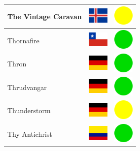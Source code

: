 \documentclass[12pt, a4paper, twoside]{report}
\begin{document}
\begin{center}
\begin{longtable}{|p{5cm}|p{2cm}|p{2cm}|}
 The Vintage Caravan                                        & \includegraphics[width=1cm]{../4x3/is} &   \includegraphics[width=1cm]{../likes/m} \\ \hline
 Thornafire                                                 & \includegraphics[width=1cm]{../4x3/cl} &   \includegraphics[width=1cm]{../likes/y} \\ \hline
 Thron                                                      & \includegraphics[width=1cm]{../4x3/de} &   \includegraphics[width=1cm]{../likes/y} \\ \hline
 Thrudvangar                                                & \includegraphics[width=1cm]{../4x3/de} &   \includegraphics[width=1cm]{../likes/y} \\ \hline
 Thunderstorm                                               & \includegraphics[width=1cm]{../4x3/de} &   \includegraphics[width=1cm]{../likes/m} \\ \hline
 Thy Antichrist                                             & \includegraphics[width=1cm]{../4x3/co} &   \includegraphics[width=1cm]{../likes/y} \\ \hline

\end{longtable}
\end{center}
\end{document}
